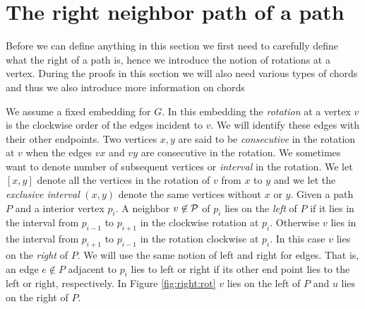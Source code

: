 

\section{The right neighbor path of a path}
  \label{s:rightNeighbour}
  Before we can define anything in this section we first need to carefully define what the right of a path is, hence we introduce the notion of rotations at a vertex. During the proofs in this section we will also need various types of chords and thus we also introduce more information on chords

    We assume a fixed embedding for $G$. In this embedding the \emph{rotation} at a vertex $v$ is the clockwise order of the edges incident to $v$. We will identify these edges with their other endpoints.
    Two vertices $x, y$ are said to be \emph{consecutive} in the rotation at $v$ when the edges $vx$ and $vy$ are consecutive in the rotation.
    We sometimes want to denote number of subsequent vertices or \emph{interval} in the rotation. We let $[x,y]$ denote all the vertices in the rotation of $v$ from $x$ to $y$ and we let the \emph{exclusive interval} $(x,y)$ denote the same vertices without $x$ or $y$.
    Given a path $P$ and a interior vertex $p_i$. A neighbor $v \not \in \mathcal{P}$ of $p_i$ lies on the \emph{left} of $P$ if it lies in the interval from $p_{i-1}$ to $p_{i+1}$ in the clockwise rotation at $p_{i}$. Otherwise $v$ lies in the interval from $p_{i+1}$ to $p_{i-1}$ in the rotation clockwise at $p_i$. In this case $v$ lies on the \emph{right} of $P$.
    We will use the same notion of left and right for edges. That is, an edge $e\nin P$ adjacent to $p_i$ lies to left or right if its other end point lies to the left or right, respectively. In Figure \ref{fig:right:rot} $v$ lies on the left of $P$ and $u$ lies on the right of $P$.

